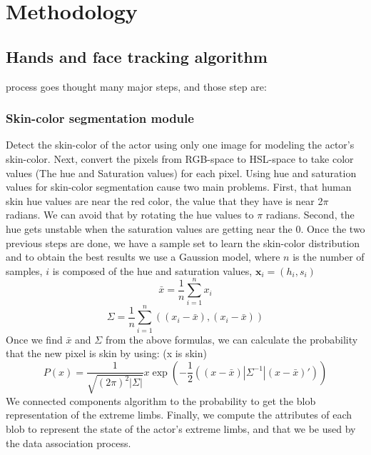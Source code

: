 \documentclass[a4paper]{article}
\begin{document}
\section{Methodology}

\subsection{Hands and face tracking algorithm} 
 process goes thought many major steps, and those step are:
\subsubsection{Skin-color segmentation module}
Detect the skin-color of the actor using only one image for modeling the actor's skin-color. Next, convert the pixels 
from RGB-space to HSL-space to take color values (The hue and Saturation values) for each pixel. Using hue and saturation
values for skin-color segmentation cause two main problems. First, that human skin hue values are near the red color, the value that they have
is near 2$\pi$ radians. We can avoid that by rotating the hue values to $\pi$ radians. Second, the hue gets unstable when the saturation values 
are getting near the 0. Once the two previous steps are done, we have a sample set to learn the skin-color distribution and to 
obtain the best results we use a Gaussion model, where $n$ is the number of samples, $i$ is composed of the hue and saturation values, $\mathbf{x}_i = (h_i,s_i)$
$$ \bar{x} = \frac {1}{n}\sum^{n}_{i =1}{x_i} $$ 
$$ \Sigma =  \frac {1}{n}\sum^{n}_{i =1}((x_i - \bar{x}),(x_i - \bar{x})) $$
Once we find $\bar{x}$ and $\Sigma$  from the above formulas, we can calculate the probability that the new pixel is skin by using: (x is skin)  
$$P(x) = \frac{1}{\sqrt{(2\pi)^2|\Sigma|}} x \exp(-\frac{1}{2}((x-\bar{x})|\Sigma^{-1}|(x-\bar{x})')) $$
We connected components algorithm to the probability to get the blob representation of the extreme limbs. Finally, we compute the attributes of 
each blob to represent the state of the actor's extreme limbs, and that we be used by the data association process.
\end{document}
